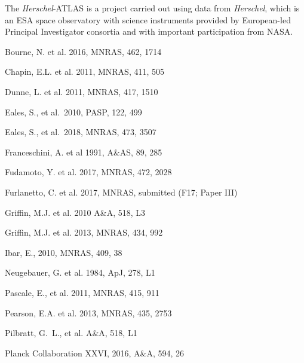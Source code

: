 \documentclass[a4paper,fleqn,usenatbib, twocolumn]{aastex61}
\def\pasp{PASP}
\begin{document}
The {\it Herschel}-ATLAS is a project carried out using data from {\it
  Herschel}, which is an ESA space observatory with science
instruments provided by European-led Principal Investigator consortia
and with important participation from NASA.


\begin{thebibliography}{}


 Bourne, N. et al. 2016, MNRAS, 462, 1714

 Chapin, E.L. et al. 2011, MNRAS, 411, 505

 Dunne, L. et al. 2011, MNRAS, 417, 1510

 Eales, S., et al.\ 2010,  \pasp, 122, 499 

 Eales, S., et al.\ 2018, MNRAS, 473, 3507

 Franceschini,
  A. et al 1991, A\&AS, 89, 285
  
 Fudamoto, Y. et al. 2017,
MNRAS, 472, 2028

 Furlanetto, C. et al. 2017,
MNRAS, submitted (F17; Paper III)

 Griffin, M.J. et al. 2010 A\&A, 518, L3

 Griffin, M.J. et al. 2013,
MNRAS, 434, 992

 Ibar, E., 2010, MNRAS, 409, 38

 Neugebauer, G. et al. 1984,
ApJ, 278, L1

 Pascale, E., et al. 2011, MNRAS, 415, 911 

 Pearson, E.A. et al. 2013, MNRAS, 435,
2753

 Pilbratt, G.~L., et al. A\&A, 518, L1

 Planck
  Collaboration XXVI, 2016, A\&A, 594, 26
  

\end{thebibliography}
\end{document}

